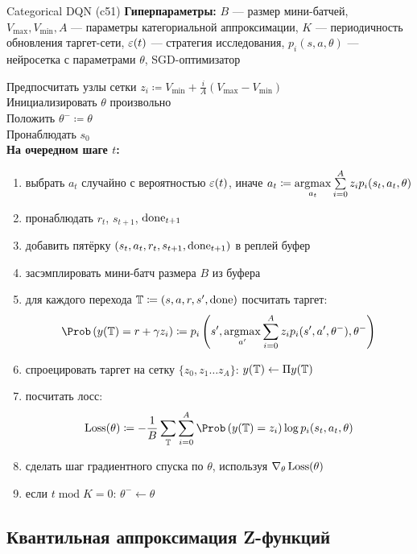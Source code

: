 \begin{algorithm}[label = c51algorithm]{Categorical DQN (c51)}
\textbf{Гиперпараметры:} $B$ --- размер мини-батчей, $V_{\max}, V_{\min}, A$ --- параметры категориальной аппроксимации, $K$ --- периодичность обновления таргет-сети, $\varepsilon(t)$ --- стратегия исследования, $p_i(s, a, \theta)$ --- нейросетка с параметрами $\theta$, SGD-оптимизатор

\vspace{0.3cm}
Предпосчитать узлы сетки $z_i \coloneqq V_{\min} + \frac{i}{A}(V_{\max} - V_{\min})$ \\
Инициализировать $\theta$ произвольно \\
Положить $\theta^- \coloneqq \theta$ \\
Пронаблюдать $s_0$ \\
\textbf{На очередном шаге $t$:}
\begin{enumerate}
    \item выбрать $a_t$ случайно с вероятностью $\varepsilon(t)$, иначе $a_t \coloneqq \mathop{\mathrm{argmax}}\limits_{a_t} \sum\limits_{i=0}^A z_i p_i(s_t, a_t, \theta)$
    \item пронаблюдать $r_t$,  $s_{t+1}$, $\mathrm{done}_{t+1}$
    \item добавить пятёрку $(s_t, a_t, r_t, s_{t+1}, \mathrm{done}_{t+1})$ в реплей буфер
    \item засэмплировать мини-батч размера $B$ из буфера
    \item для каждого перехода $\mathbb{T} \coloneqq (s, a, r, s', \mathrm{done})$ посчитать таргет:
    $$\Prob \left( y(\T) = r + \gamma z_i \right) \coloneqq p_i\left( s', \argmax_{a'} \sum_{i=0}^A z_i p_i(s', a', \theta^-), \theta^- \right) $$
    \item спроецировать таргет на сетку $\{ z_0, z_1 \dots z_{A} \}$: $y(\mathbb{T}) \leftarrow \Pi y(\mathbb{T})$ 
    \item посчитать лосс:
    $$\Loss(\theta) \coloneqq -\frac{1}{B}\sum_{\T} \sum_{i=0}^{A} \Prob \left( y(\T) = z_i \right) \log p_i(s_t, a_t, \theta) $$
    \item сделать шаг градиентного спуска по $\theta$, используя $\nabla_\theta \operatorname{Loss}(\theta)$
    \item если $t \operatorname{mod} K = 0$: $\theta^- \gets \theta$
\end{enumerate}
\end{algorithm}

\subsection{Квантильная аппроксимация Z-функций}


